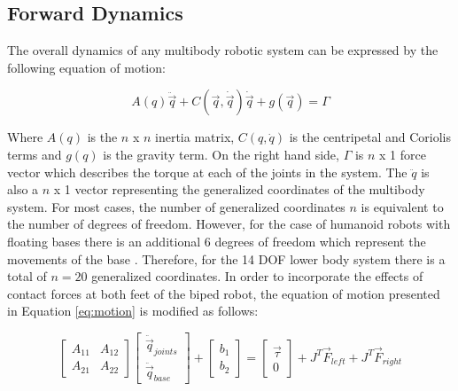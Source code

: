 \subsection{Forward Dynamics} %
\label{sec:forward_dynamics}

The overall dynamics of any multibody robotic system can be expressed by the following equation of motion: 

\begin{equation}
	\label{eq:motion}
	A(q)\ddot{\vec{q}} + C(\vec{q},\dot{\vec{q}})\dot{\vec{q}} + g(\vec{q}) = \Gamma
\end{equation}

Where $A(q)$ is the $n$ x $n$ inertia matrix, $C(q,\dot{q})$ is the centripetal and Coriolis terms and $g(q)$ is the gravity term. On the right hand side, $\Gamma$ is $n$ x 1 force vector which describes the torque at each of the joints in the system. The $\ddot{q}$ is also a $n$ x 1 vector representing the generalized coordinates of the multibody system. For most cases, the number of generalized coordinates $n$ is equivalent to the number of degrees of freedom. However, for the case of humanoid robots with floating bases there is an additional 6 degrees of freedom which represent the movements of the base \cite{Perrin:1997wn}. Therefore, for the 14 DOF lower body system there is a total of $n = 20$ generalized coordinates. In order to incorporate the effects of contact forces at both feet of the biped robot, the equation of motion presented in Equation \ref{eq:motion} is modified as follows: 


\begin{equation}
	\label{eq:motion2}
	\begin{bmatrix} A_{11} & A_{12} \\ A_{21} & A_{22} \end{bmatrix} 
	\begin{bmatrix} \ddot{\vec{q}}_{joints} \\ \ddot{\vec{q}}_{base} \end{bmatrix} + 
	\begin{bmatrix} b_{1} \\ b_{2} \end{bmatrix} = 
	\begin{bmatrix} \vec{\tau} \\ 0 \end{bmatrix} + 
    J^{T}\vec{F}_{left} + J^{T}\vec{F}_{right}
\end{equation}

